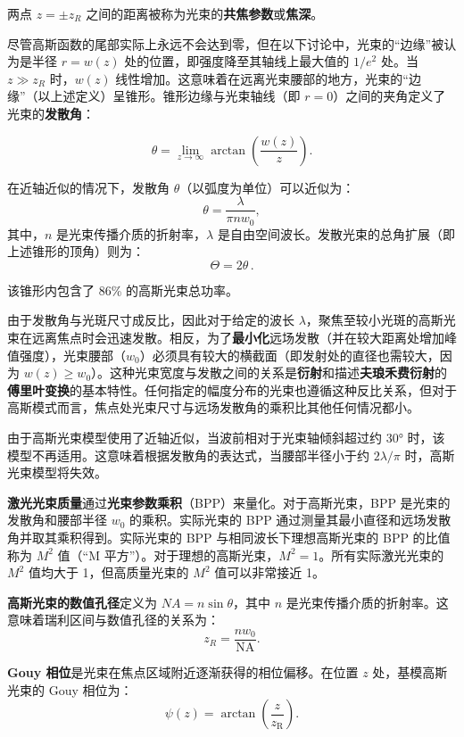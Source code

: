 \begin{enumerate}
\begin{enumerate}
\begin{itemize}
			两点 $z = \pm z_R$ 之间的距离被称为光束的\textbf{共焦参数}或\textbf{焦深}。
			
			尽管高斯函数的尾部实际上永远不会达到零，但在以下讨论中，光束的“边缘”被认为是半径 $r = w(z)$ 处的位置，即强度降至其轴线上最大值的 $1/e^2$ 处。当 $z \gg z_R$ 时，$w(z)$ 线性增加。这意味着在远离光束腰部的地方，光束的“边缘”（以上述定义）呈锥形。锥形边缘与光束轴线（即 $r = 0$）之间的夹角定义了光束的\textbf{发散角}：
			
			\[
			\theta = \lim_{z \to \infty} \arctan\left(\frac{w(z)}{z}\right).
			\]
			
			在近轴近似的情况下，发散角 $\theta$（以弧度为单位）可以近似为：
			\[
			\theta = \frac{\lambda}{\pi n w_0},
			\]
			其中，$n$ 是光束传播介质的折射率，$\lambda$ 是自由空间波长。发散光束的总角扩展（即上述锥形的顶角）则为：
			\[
			\Theta = 2 \theta\,.
			\]
			
			该锥形内包含了 86\% 的高斯光束总功率。
			
			由于发散角与光斑尺寸成反比，因此对于给定的波长 $\lambda$，聚焦至较小光斑的高斯光束在远离焦点时会迅速发散。相反，为了\textbf{最小化}远场发散（并在较大距离处增加峰值强度），光束腰部（$w_0$）必须具有较大的横截面（即发射处的直径也需较大，因为 $w(z) \geq w_0$）。这种光束宽度与发散之间的关系是\textbf{衍射}和描述\textbf{夫琅禾费衍射}的\textbf{傅里叶变换}的基本特性。任何指定的幅度分布的光束也遵循这种反比关系，但对于高斯模式而言，焦点处光束尺寸与远场发散角的乘积比其他任何情况都小。
			
			由于高斯光束模型使用了近轴近似，当波前相对于光束轴倾斜超过约 30° 时，该模型不再适用。这意味着根据发散角的表达式，当腰部半径小于约 $2\lambda / \pi$ 时，高斯光束模型将失效。
			
			\textbf{激光光束质量}通过\textbf{光束参数乘积}（BPP）来量化。对于高斯光束，BPP 是光束的发散角和腰部半径 $w_0$ 的乘积。实际光束的 BPP 通过测量其最小直径和远场发散角并取其乘积得到。实际光束的 BPP 与相同波长下理想高斯光束的 BPP 的比值称为 $M^2$ 值（``M 平方''）。对于理想的高斯光束，$M^2 = 1$。所有实际激光光束的 $M^2$ 值均大于 1，但高质量光束的 $M^2$ 值可以非常接近 1。
			
			\textbf{高斯光束的数值孔径}定义为 $NA = n \sin \theta$，其中 $n$ 是光束传播介质的折射率。这意味着瑞利区间与数值孔径的关系为：
			\[
			z_R = \frac{n w_0}{\mathrm{NA}}.
			\]
			
			\textbf{Gouy 相位}是光束在焦点区域附近逐渐获得的相位偏移。在位置 $z$ 处，基模高斯光束的 Gouy 相位为：
			\[
			\psi(z) = \arctan \left( \frac{z}{z_\mathrm{R}} \right).
			\]
			

\end{itemize}
\end{enumerate}
\end{enumerate}
